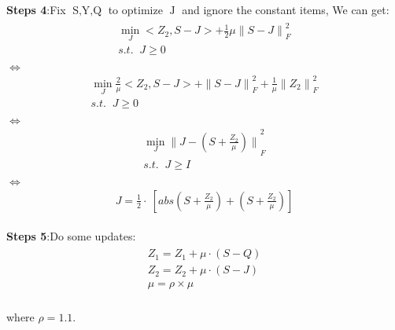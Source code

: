 \documentclass{article}
\begin{document}
\begin{flushleft}
\textbf{Steps 4}:\;\;Fix $\mathop{S,Y,Q}$ to optimize $\mathop{J}$ and ignore the constant items, We can get:
\begin{eqnarray}
\begin{array}{l}
    \mathop{\min}\limits_{J} <Z_2,S-J> + \frac{1}{2}\mu {\parallel S - J \parallel}_F^2  \\
    s.t. \;\; J \geq 0\\
\end{array}
\end{eqnarray}
$\Longleftrightarrow$
\begin{eqnarray}
\begin{array}{l}
    \mathop{\min}\limits_{J} \frac{2}{\mu} <Z_2,S-J> + {\parallel S - J \parallel}_F^2  + \frac{1}{\mu}{\parallel Z_2\parallel}_F^2\\
    s.t. \;\; J \geq 0\\
\end{array}
\end{eqnarray}
$\Longleftrightarrow$
\begin{eqnarray}
\begin{array}{l}
    \mathop{\min}\limits_{J} {\parallel J-(S+ \frac{Z_2}{\mu} )\parallel}_F^2\\
    s.t. \;\; J \geq I\\
\end{array}
\end{eqnarray}
$\Longleftrightarrow$
\begin{eqnarray}
\begin{array}{l}
    J=\frac{1}{2}\cdot\ [abs(S+ \frac{Z_2}{\mu})+ (S+ \frac{Z_2}{\mu})]
\end{array}
\end{eqnarray}
\end{flushleft}

\begin{flushleft}
\textbf{Steps 5}:\;\;Do some updates:
\begin{eqnarray}
\begin{array}{l}
Z_1 = Z_1 + \mu \cdot (S-Q)\\
Z_2 = Z_2 + \mu \cdot (S-J)\\
\mu = \rho \times \mu
\end{array}
\end{eqnarray}\\
where $\rho = 1.1 $.
\end{flushleft}
\end{document}
